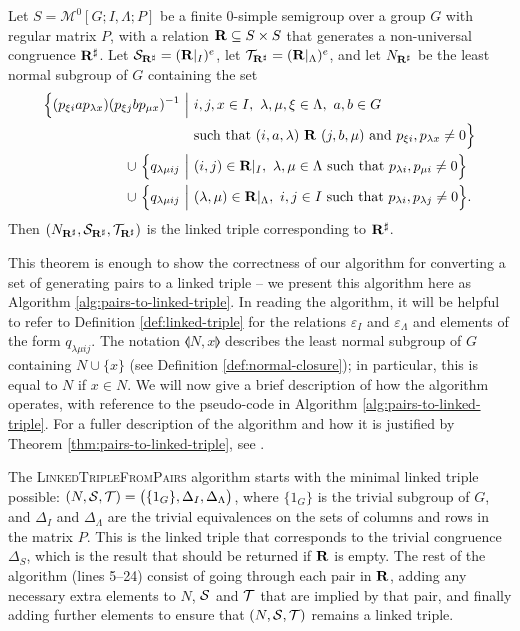 \begin{theorem}
  \label{thm:pairs-to-linked-triple}
  Let $S = \mathcal{M}^0[G;I,\Lambda;P]$ be a finite 0-simple semigroup over a
  group $G$ with regular matrix $P$, with a relation $\mathbf{R} \subseteq S \times S$
  that generates a non-universal congruence $\mathbf{R}^\sharp$.  Let
  $\mathcal{S}_{\mathbf{R}^\sharp} = (\mathbf{R}|_I)^e$, let
  $\mathcal{T}_{\mathbf{R}^\sharp} = (\mathbf{R}|_\Lambda)^e$, and let $N_{\mathbf{R}^\sharp}$ be
  the least normal subgroup of $G$ containing the set
  \begin{align*}
    \Big\{(p_{\xi i} a p_{\lambda x}) (p_{\xi j} b p_{\mu x})^{-1} ~\Big|~
    & i,j,x \in I,\ \lambda, \mu, \xi \in \Lambda,\ a,b \in G \\
    & \text{such that~} (i,a,\lambda) ~\mathbf{R}~ (j,b,\mu) \text{~and~}
      p_{\xi i}, p_{\lambda x} \neq 0\Big\} \\
    \cup~ \Big\{q_{\lambda \mu i j} ~\Big|~ &
           (i,j) \in \mathbf{R}|_I,~
           \lambda,\mu \in \Lambda ~\textnormal{such that}~
           p_{\lambda i}, p_{\mu i} \neq 0\Big\} \\
    \cup~ \Big\{q_{\lambda \mu i j} ~\Big|~ &
           (\lambda,\mu) \in \mathbf{R}|_\Lambda,~
           i,j \in I ~\textnormal{such that}~
           p_{\lambda i}, p_{\lambda j} \neq 0\Big\}. \\
  \end{align*}
  Then $(N_{\mathbf{R}^\sharp}, \mathcal{S}_{\mathbf{R}^\sharp}, \mathcal{T}_{\mathbf{R}^\sharp})$
  is the linked triple corresponding to $\mathbf{R}^\sharp$.
\end{theorem}

This theorem is enough to show the correctness of our algorithm for converting a
set of generating pairs to a linked triple -- we present this algorithm here as
Algorithm \ref{alg:pairs-to-linked-triple}.  In reading the algorithm, it will
be helpful to refer to Definition \ref{def:linked-triple} for the relations
$\varepsilon_I$ and $\varepsilon_\Lambda$ and elements of the form
$q_{\lambda \mu i j}$.  The notation $\llangle N, x \rrangle$ describes the
least normal subgroup of $G$ containing $N \cup \{x\}$ (see Definition
\ref{def:normal-closure}); in particular, this is equal to $N$ if $x \in N$.
We will now give a brief description of how the algorithm operates, with
reference to the pseudo-code in Algorithm \ref{alg:pairs-to-linked-triple}.
For a fuller description of the algorithm and how it is justified by Theorem
\ref{thm:pairs-to-linked-triple}, see \cite[\S 3.2]{mtorpey_msc}.

The \textsc{LinkedTripleFromPairs} algorithm starts with the minimal linked
triple possible: $(N, \mathcal{S}, \mathcal{T}) = \big(\{1_G\}, \Delta_I, \Delta_\Lambda\big)$,
where $\{1_G\}$ is the trivial subgroup of $G$, and $\Delta_I$ and
$\Delta_\Lambda$ are the trivial equivalences on the sets of columns and rows in
the matrix $P$.  This is the linked triple that corresponds to the trivial
congruence $\Delta_S$, which is the result that should be returned if $\mathbf{R}$ is
empty.  The rest of the algorithm (lines 5--24) consist of going through each
pair in $\mathbf{R}$, adding any necessary extra elements to $N$, $\mathcal{S}$ and $\mathcal{T}$
that are implied by that pair, and finally adding further elements to ensure
that $(N, \mathcal{S}, \mathcal{T})$ remains a linked triple.

